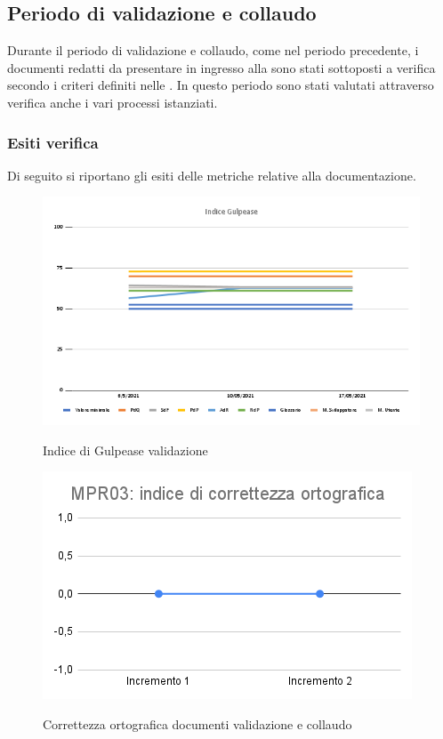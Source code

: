 \subsection{Periodo di validazione e collaudo} \label{ResocontoValidazione}
Durante il periodo di validazione e collaudo, come nel periodo precedente, i documenti redatti da presentare in ingresso alla  sono stati sottoposti a verifica secondo i criteri definiti nelle . In questo periodo sono stati valutati attraverso verifica anche i vari processi istanziati.
\subsubsection{Esiti verifica}
Di seguito si riportano gli esiti delle metriche relative alla documentazione.
\begin{figure}[h]
	\centering
	\includegraphics[scale=0.5]{Immagini/GulpeaseValidazione}\\
	\caption{Indice di Gulpease validazione}
	\label{fig:GulpeaseValidazione}
\end{figure}
\begin{figure}[h]
	\centering
	\includegraphics[scale=0.6]{Immagini/MPR03_cortograficaValidazione.png}\\
	\caption{Correttezza ortografica documenti validazione e collaudo}
	\label{fig:CortOrtograficaValidazione}
\end{figure}
